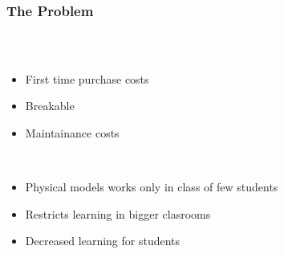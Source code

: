 \begin{frame}
  \frametitle{The Problem}
  \begin{columns}
    \begin{column}{0.8\textwidth}
      \begin{description}[]
        \item[Expensive 3D Models] \hfill \\
        \begin{itemize}
          \item First time purchase costs
          \item Breakable
          \item Maintainance costs
        \end{itemize}

        \bigskip
        \item[Restricted number of 3D models] \hfill \\
          \begin{itemize}
            \item Physical models works only in class of few students
            \item Restricts learning in bigger clasrooms
            \item Decreased learning for students
        \end{itemize}
      \end{description}
    \end{column}


\end{columns}
\end{frame}
